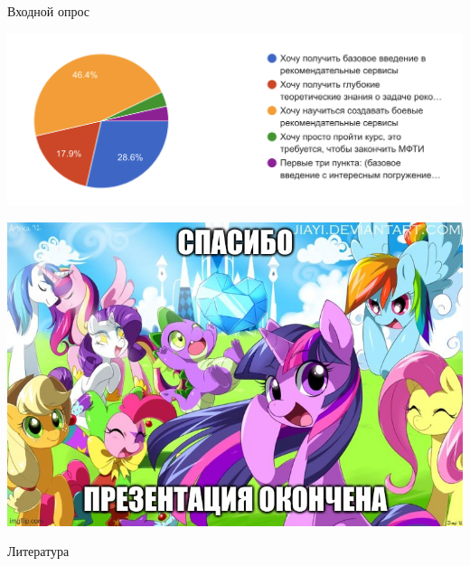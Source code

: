 \documentclass[11pt,aspectratio=169,handout]{beamer}
\begin{document}
\begin{frame}{Входной опрос}

\begin{center}
\includegraphics[scale=0.4]{images/poll.png}
\end{center}

\end{frame}

\begin{frame}{}

\begin{center}
\includegraphics[scale=0.4]{images/thankyou.jpeg}
\end{center}

\end{frame}

\begin{frame}[allowframebreaks]{Литература}




\end{frame}
\end{document}
